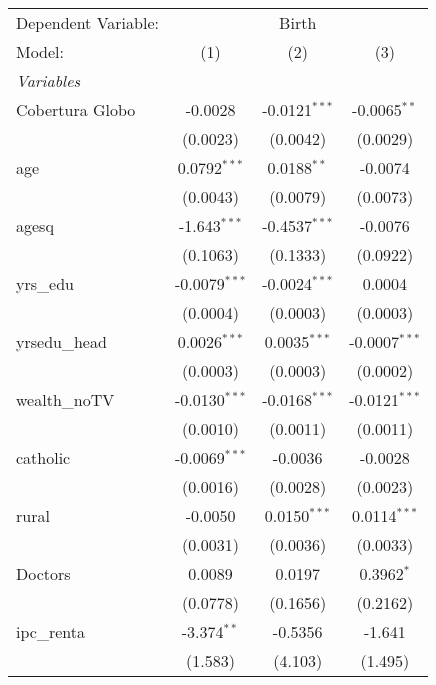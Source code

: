 \begingroup
\centering
\begin{tabular}{lccc}
   \tabularnewline \midrule \midrule
   Dependent Variable: & \multicolumn{3}{c}{Birth}\\
   Model:          & (1)             & (2)             & (3)\\  
   \midrule
   \emph{Variables}\\
   Cobertura Globo & -0.0028         & -0.0121$^{***}$ & -0.0065$^{**}$\\   
                   & (0.0023)        & (0.0042)        & (0.0029)\\   
   age             & 0.0792$^{***}$  & 0.0188$^{**}$   & -0.0074\\   
                   & (0.0043)        & (0.0079)        & (0.0073)\\   
   agesq           & -1.643$^{***}$  & -0.4537$^{***}$ & -0.0076\\   
                   & (0.1063)        & (0.1333)        & (0.0922)\\   
   yrs\_edu        & -0.0079$^{***}$ & -0.0024$^{***}$ & 0.0004\\   
                   & (0.0004)        & (0.0003)        & (0.0003)\\   
   yrsedu\_head    & 0.0026$^{***}$  & 0.0035$^{***}$  & -0.0007$^{***}$\\   
                   & (0.0003)        & (0.0003)        & (0.0002)\\   
   wealth\_noTV    & -0.0130$^{***}$ & -0.0168$^{***}$ & -0.0121$^{***}$\\   
                   & (0.0010)        & (0.0011)        & (0.0011)\\   
   catholic        & -0.0069$^{***}$ & -0.0036         & -0.0028\\   
                   & (0.0016)        & (0.0028)        & (0.0023)\\   
   rural           & -0.0050         & 0.0150$^{***}$  & 0.0114$^{***}$\\   
                   & (0.0031)        & (0.0036)        & (0.0033)\\   
   Doctors         & 0.0089          & 0.0197          & 0.3962$^{*}$\\   
                   & (0.0778)        & (0.1656)        & (0.2162)\\   
   ipc\_renta      & -3.374$^{**}$   & -0.5356         & -1.641\\   
                   & (1.583)         & (4.103)         & (1.495)\\   

\end{tabular}
